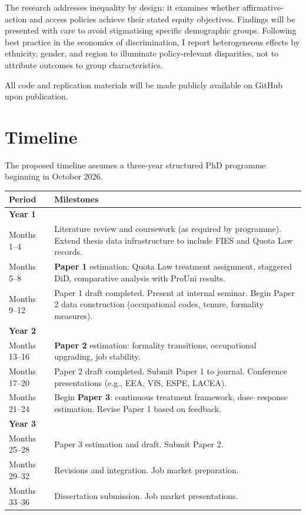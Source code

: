 \documentclass[a4paper,11pt]{article}
\begin{document}
The research addresses inequality by design: it examines whether affirmative-action and access policies achieve their stated equity objectives. Findings will be presented with care to avoid stigmatising specific demographic groups. Following best practice in the economics of discrimination, I report heterogeneous effects by ethnicity, gender, and region to illuminate policy-relevant disparities, not to attribute outcomes to group characteristics.

All code and replication materials will be made publicly available on GitHub upon publication.

\section{Timeline}

The proposed timeline assumes a three-year structured PhD programme beginning in October 2026.

\begin{table}[h]
\centering
\small
\begin{tabular}{@{}lp{10.5cm}@{}}
\toprule
\textbf{Period} & \textbf{Milestones} \\
\midrule
\textbf{Year 1} & \\
Months 1--4 & Literature review and coursework (as required by programme). Extend thesis data infrastructure to include FIES and Quota Law records. \\
Months 5--8 & \textbf{Paper 1} estimation: Quota Law treatment assignment, staggered DiD, comparative analysis with ProUni results. \\
Months 9--12 & Paper 1 draft completed. Present at internal seminar. Begin Paper 2 data construction (occupational codes, tenure, formality measures). \\[4pt]
\textbf{Year 2} & \\
Months 13--16 & \textbf{Paper 2} estimation: formality transitions, occupational upgrading, job stability. \\
Months 17--20 & Paper 2 draft completed. Submit Paper 1 to journal. Conference presentations (e.g., EEA, VfS, ESPE, LACEA). \\
Months 21--24 & Begin \textbf{Paper 3}: continuous treatment framework, dose--response estimation. Revise Paper 1 based on feedback. \\[4pt]
\textbf{Year 3} & \\
Months 25--28 & Paper 3 estimation and draft. Submit Paper 2. \\
Months 29--32 & Revisions and integration. Job market preparation. \\
Months 33--36 & Dissertation submission. Job market presentations. \\
\bottomrule
\end{tabular}
\end{table}
\end{document}

